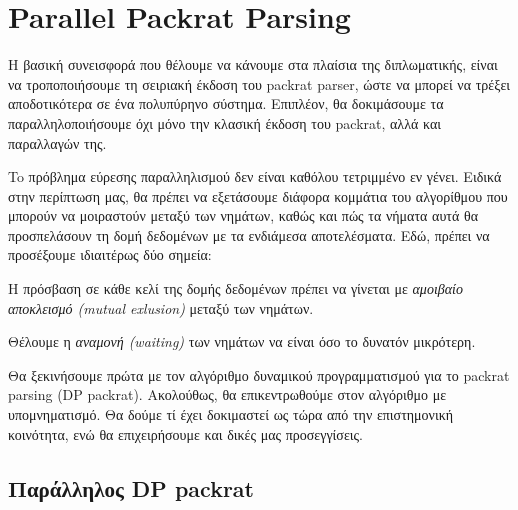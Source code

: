 \chapter{ Parallel Packrat Parsing }
\label{ch:parallel}

Η βασική συνεισφορά που θέλουμε να κάνουμε στα πλαίσια της διπλωματικής, είναι να τροποποιήσουμε τη σειριακή έκδοση του packrat parser, ώστε να μπορεί να τρέξει αποδοτικότερα σε ένα πολυπύρηνο σύστημα.
Επιπλέον, θα δοκιμάσουμε τα παραλληλοποιήσουμε όχι μόνο την κλασική έκδοση του packrat, αλλά και παραλλαγών της.

To πρόβλημα εύρεσης παραλληλισμού δεν είναι καθόλου τετριμμένο εν γένει. 
Ειδικά στην περίπτωση μας, θα πρέπει να εξετάσουμε διάφορα κομμάτια του αλγορίθμου που μπορούν να μοιραστούν μεταξύ των νημάτων, καθώς και πώς τα νήματα αυτά θα προσπελάσουν τη δομή δεδομένων με τα ενδιάμεσα αποτελέσματα.
Εδώ, πρέπει να προσέξουμε ιδιαιτέρως δύο σημεία:

\begin{description}[font=$\bullet$\scshape\bfseries]
	\item Η πρόσβαση σε κάθε κελί της δομής δεδομένων πρέπει να γίνεται με \textit{αμοιβαίο αποκλεισμό (mutual exlusion)} μεταξύ των νημάτων.
	\item Θέλουμε η \textit{αναμονή (waiting)} των νημάτων να είναι όσο το δυνατόν μικρότερη.
\end{description}

Θα ξεκινήσουμε πρώτα με τον αλγόριθμο δυναμικού προγραμματισμού για το packrat parsing (DP packrat).
Ακολούθως, θα επικεντρωθούμε στον αλγόριθμο με υπομνηματισμό.
Θα δούμε τί έχει δοκιμαστεί ως τώρα από την επιστημονική κοινότητα, ενώ θα επιχειρήσουμε και δικές μας προσεγγίσεις.

\section{Παράλληλος DP packrat}

